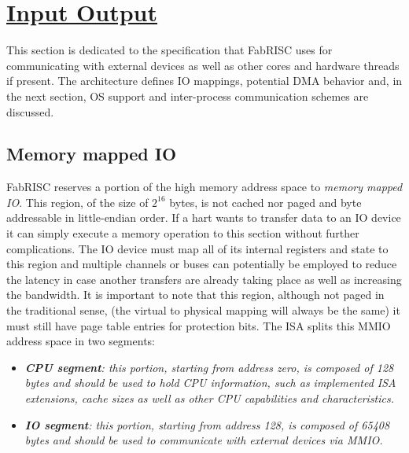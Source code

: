 \documentclass{article}
\begin{document}
    \clearpage


    \section[Input Output]{\LARGE\underline{Input Output}} %

        This section is dedicated to the specification that FabRISC uses for communicating with external devices as well as other cores and hardware threads if present. The architecture defines IO mappings, potential DMA behavior and, in the next section, OS support and inter-process communication schemes are discussed.

        \subsection{Memory mapped IO}

            FabRISC reserves a portion of the high memory address space to \textit{memory mapped IO}. This region, of the size of $2^{16}$ bytes, is not cached nor paged and byte addressable in little-endian order. If a hart wants to transfer data to an IO device it can simply execute a memory operation to this section without further complications. The IO device must map all of its internal registers and state to this region and multiple channels or buses can potentially be employed to reduce the latency in case another transfers are already taking place as well as increasing the bandwidth. It is important to note that this region, although not paged in the traditional sense, (the virtual to physical mapping will always be the same) it must still have page table entries for protection bits. The ISA splits this MMIO address space in two segments:

            \begin{itemize}

                \item \textit{\textbf{CPU segment}: this portion, starting from address zero, is composed of 128 bytes and should be used to hold CPU information, such as implemented ISA extensions, cache sizes as well as other CPU capabilities and characteristics.}

                \item \textit{\textbf{IO segment}: this portion, starting from address 128, is composed of 65408 bytes and should be used to communicate with external devices via MMIO.}

            \end{itemize}
\end{document}
